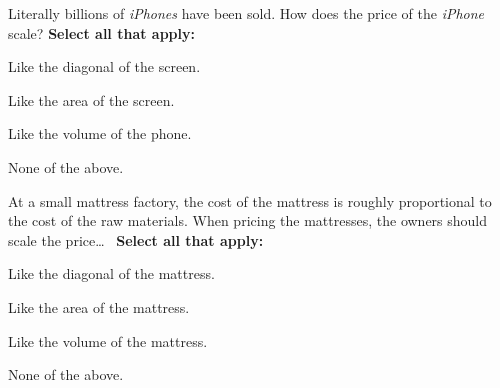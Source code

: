\documentclass[noauthor,nooutcomes]{ximera}
\begin{document}
\begin{exercise}
  Literally billions of \textit{iPhones} have been sold. How does the
  price of the \textit{iPhone} scale?
\textbf{Select all that apply:}
 \begin{enumerate}
   \begin{multicols}{2}
   \item Like the diagonal of the screen.
   \item Like the area of the screen.
   \item Like the volume of the phone.
   \item None of the above.
   \end{multicols}
 \end{enumerate}
\end{exercise}


\begin{exercise}
  At a small mattress factory, the cost of the mattress is roughly
  proportional to the cost of the raw materials. When pricing the
  mattresses, the owners should scale the price\dots~
\textbf{Select all that apply:}
 \begin{enumerate}
   \begin{multicols}{2}
   \item Like the diagonal of the mattress.
   \item Like the area of the mattress.
   \item Like the volume of the mattress.
   \item None of the above.
   \end{multicols}
 \end{enumerate}
\end{exercise}




\end{document}
